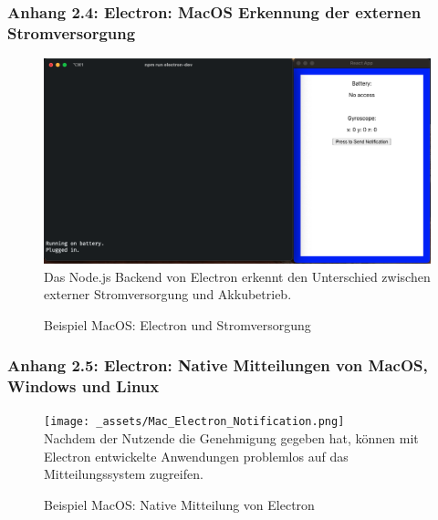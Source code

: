 \documentclass[a4paper]{scrartcl}
\begin{document}
\newpage

\subsubsection*{Anhang 2.4: Electron: MacOS Erkennung der externen Stromversorgung}

\begin{figure}[H]
	\centering
	\caption{Beispiel MacOS: Electron und Stromversorgung}
	\includegraphics[scale=0.3]{_assets/Mac_Electron_Energy.png} \\
	Das Node.js Backend von Electron erkennt den Unterschied zwischen externer Stromversorgung und Akkubetrieb.
\end{figure}

\newpage

\subsubsection*{Anhang 2.5: Electron: Native Mitteilungen von MacOS, Windows und Linux}

\begin{figure}[H]
	\centering
	\caption{Beispiel MacOS: Native Mitteilung von Electron}
	\texttt{[image: \_assets/Mac\_Electron\_Notification.png]} \\
	Nachdem der Nutzende die Genehmigung gegeben hat, können mit Electron entwickelte Anwendungen problemlos auf das Mitteilungssystem zugreifen.
\end{figure}
\end{document}
